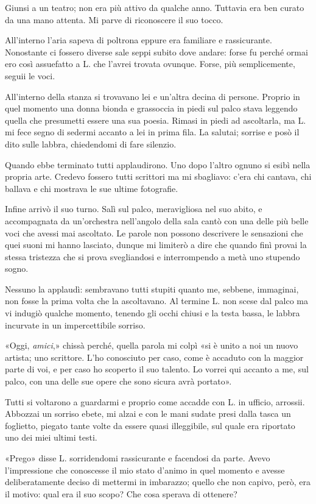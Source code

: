\documentclass[a4paper,11pt,oneside,openright,final]{memoir}
\begin{document}
Giunsi a un teatro; non era più attivo da qualche anno. Tuttavia era ben curato
da una mano attenta. Mi parve di riconoscere il suo tocco.

All'interno l'aria sapeva di poltrona eppure era familiare e rassicurante.
Nonostante ci fossero diverse sale seppi subito dove andare: forse fu perché
ormai ero così assuefatto a L. che l'avrei trovata ovunque. Forse, più
semplicemente, seguii le voci.

All'interno della stanza si trovavano lei e un'altra decina di persone. Proprio
in quel momento una donna bionda e grassoccia in piedi sul palco stava leggendo
quella che presumetti essere una sua poesia. Rimasi in piedi ad ascoltarla, ma
L. mi fece segno di sedermi accanto a lei in prima fila. La salutai; sorrise e
posò il dito sulle labbra, chiedendomi di fare silenzio.

Quando ebbe terminato tutti applaudirono. Uno dopo l'altro ognuno si esibì nella
propria arte. Credevo fossero tutti scrittori ma mi sbagliavo: c'era chi
cantava, chi ballava e chi mostrava le sue ultime fotografie.

Infine arrivò il suo turno. Salì sul palco, meravigliosa nel suo abito, e
accompagnata da un'orchestra nell'angolo della sala cantò con una delle più
belle voci che avessi mai ascoltato. Le parole non possono descrivere le
sensazioni che quei suoni mi hanno lasciato, dunque mi limiterò a dire che
quando finì provai la stessa tristezza che si prova svegliandosi e interrompendo
a metà uno stupendo sogno.

Nessuno la applaudì: sembravano tutti stupiti quanto me, sebbene, immaginai,
non fosse la prima volta che la ascoltavano. Al termine L. non scese dal palco
ma vi indugiò qualche momento, tenendo gli occhi chiusi e la testa bassa, le
labbra incurvate in un impercettibile sorriso.

«Oggi, \emph{amici},» chissà perché, quella parola mi colpì «si è unito a noi un
nuovo artista; uno scrittore. L'ho conosciuto per caso, come è accaduto con la
maggior parte di voi, e per caso ho scoperto il suo talento. Lo vorrei qui
accanto a me, sul palco, con una delle sue opere che sono sicura avrà portato».

Tutti si voltarono a guardarmi e proprio come accadde con L. in ufficio,
arrossii. Abbozzai un sorriso ebete, mi alzai e con le mani sudate presi dalla
tasca un foglietto, piegato tante volte da essere quasi illeggibile, sul quale
era riportato uno dei miei ultimi testi.

«Prego» disse L. sorridendomi rassicurante e facendosi da parte. Avevo
l'impressione che conoscesse il mio stato d'animo in quel momento e avesse
deliberatamente deciso di mettermi in imbarazzo; quello che non capivo, però,
era il motivo: qual era il suo scopo? Che cosa sperava di ottenere?
\end{document}
